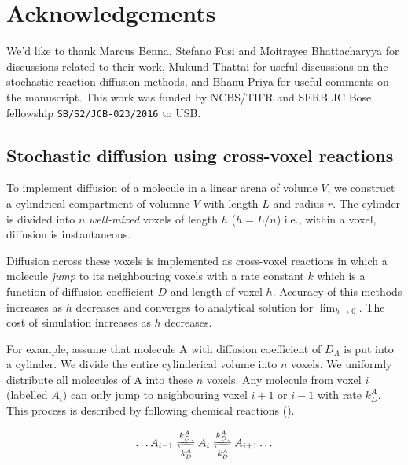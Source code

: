 \documentclass[9pt,lineno,doublespacing]{elife}
\begin{document}
\section{Acknowledgements}
We'd like to thank Marcus Benna, Stefano Fusi and Moitrayee Bhattacharyya for
discussions related to their work, Mukund Thattai for useful discussions on the
stochastic reaction diffusion methods, and Bhanu Priya for useful comments on
the manuscript. This work was funded by NCBS/TIFR and SERB JC Bose fellowship
\texttt{SB/S2/JCB-023/2016} to USB.

 

\appendix
\begin{appendixbox}

\subsection*{Stochastic diffusion using cross-voxel reactions}\label{sec:diff_as_gillespie}

To implement diffusion of a molecule in a linear arena of volume $V$, we
construct a cylindrical compartment of volumne $V$ with length $L$ and radius
$r$. The cylinder is divided into $n$ \emph{well-mixed} voxels of length $h$
($h=L/n$) i.e., within a voxel, diffusion is instantaneous.

Diffusion across these voxels is implemented as cross-voxel reactions in which a
molecule \emph{jump} to its neighbouring voxels with a rate constant $k$ which
is a function of diffusion coefficient $D$ and length of voxel $h$. Accuracy of
this methods increases as $h$ decreases and converges to analytical solution for
$\lim_{h \to 0}$. The cost of simulation increases as $h$ decreases.

For example, assume that molecule A with diffusion coefficient of $D_A$ is put
into a cylinder. We divide the entire cylinderical volume into $n$ voxels. We
uniformly distribute all molecules of A into these $n$ voxels. Any molecule from
voxel $i$ (labelled $A_i$) can only jump to neighbouring voxel $i+1$ or $i-1$
with rate $k_D^A$. This process is described by following chemical reactions
().

\begin{equation}
\begin{gathered}
    \ldots A_{i-1} \xrightleftharpoons[k_D^A]{k_D^A} A_{i}
    \xrightleftharpoons[k_D^A]{k_D^A} A_{i+1} \ldots
\end{gathered}
\label{eq:stoch_diff}
\end{equation}



\end{appendixbox}
\end{document}
